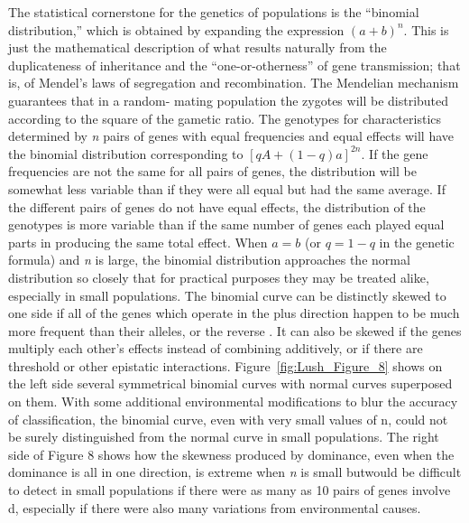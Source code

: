 {
The statistical cornerstone for the genetics of populations is the
``binomial distribution,'' which is obtained by expanding the expression
$(a + b)^n$. This is just the mathematical description of what results
naturally from the duplicateness of inheritance and the ``one-or-otherness''
of gene transmission; that is, of Mendel's laws of segregation and
recombination. The Mendelian mechanism guarantees that in a random-
mating population the zygotes will be distributed according to the
square of the gametic ratio. The genotypes for characteristics determined
by \textit{n} pairs of genes with equal frequencies and equal effects will
have the binomial distribution corresponding to $[qA + (1 - q)a]^{2n}$.
If the gene frequencies are not the same for all pairs of genes, the
distribution will be somewhat less variable than if they were all equal but
had the same average. If the different pairs of genes do not have equal
effects, the distribution of the genotypes is more variable than if the
same number of genes each played equal parts in producing the same
total effect. When $a = b$ (or $q = 1 - q$ in the genetic formula) and
\textit{n} is large, the binomial distribution approaches the normal
distribution so closely that for practical purposes they may be treated alike,
especially in small populations. The binomial curve can be distinctly skewed
to one side if all of the genes which operate in the plus direction happen
to be much more frequent than their alleles, or the reverse . It can also be
skewed if the genes multiply each other's effects instead of combining additively,
or if there are threshold or other epistatic interactions.
Figure~\ref{fig:Lush_Figure_8} shows on the left side several symmetrical
binomial curves with normal curves superposed on them. With some additional
environmental modifications to blur the accuracy of classification, the binomial
curve, even with very small values of n, could not be surely distinguished from
the normal curve in small populations. The right side of Figure 8 shows how the
skewness produced by dominance, even when the dominance is all in one direction,
is extreme when \textit{n} is small butwould be difficult to detect in small
populations if there were as many as 10 pairs of genes involve d, especially if
there were also many variations from environmental causes.

}
